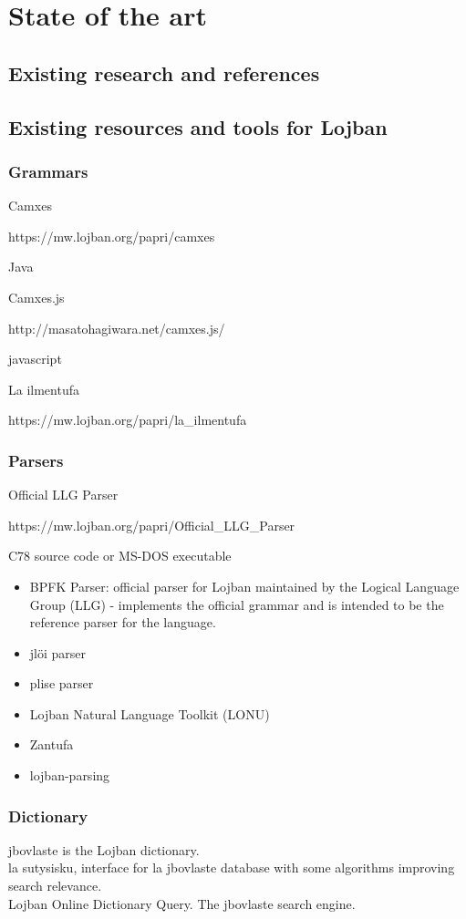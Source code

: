 \chapter{State of the art}

\section{Existing research and references}

\section{Existing resources and tools for Lojban}

\vspace{0.5cm}

\subsection{Grammars}

Camxes

https://mw.lojban.org/papri/camxes

Java

Camxes.js

http://masatohagiwara.net/camxes.js/

javascript

La ilmentufa

https://mw.lojban.org/papri/la\_ilmentufa


\subsection{Parsers}

Official LLG Parser

https://mw.lojban.org/papri/Official\_LLG\_Parser

C78 source code
or
MS-DOS executable

\begin{itemize}
    \item BPFK Parser: official parser for Lojban maintained by the Logical Language Group (LLG) - implements the official grammar and is intended to be the reference parser for the language.
    \item jlöi parser
    \item plise parser
    \item Lojban Natural Language Toolkit (LONU)
    \item Zantufa
    \item lojban-parsing
\end{itemize}

\subsection{Dictionary}
\label{sec:dictionary}

jbovlaste is the Lojban dictionary. \\

la sutysisku, interface for la jbovlaste database with some algorithms improving search relevance. \\

Lojban Online Dictionary Query. The jbovlaste search engine.\\